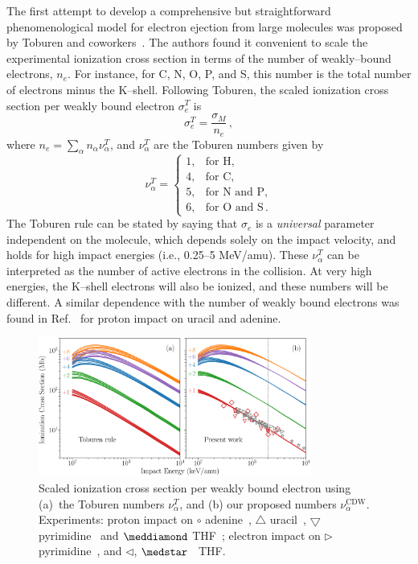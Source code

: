 \documentclass[10pt,showpacs,twocolumn]{revtex4}
\begin{document}
The first attempt to develop a comprehensive but straightforward 
phenomenological model for electron ejection from large molecules was 
proposed by Toburen and coworkers~\cite{toburen1975,toburen1976}. 
The authors found it convenient to scale the experimental ionization 
cross section in terms of the number of weakly--bound electrons, $n_e$.
For instance, for C, N, O, P, and S, this number is the total number of 
electrons minus the K--shell. Following Toburen, the scaled ionization 
cross section per weakly bound electron $\sigma_{e}^T$ is
\begin{equation}
\sigma_{e}^T=\frac{\sigma_{M}}{n_e}\,, 
\label{27} 
\end{equation}
where $n_e=\sum_{\alpha}n_{\alpha}\nu_{\alpha}^T$, and $\nu_{\alpha}^T$ 
are the Toburen numbers given by
\begin{equation}
\nu_{\alpha}^T=\left\{ 
\begin{array}{ll}
1, & \text{for H,} \\
4, & \text{for C,} \\ 
5, & \text{for N and P,} \\ 
6, & \text{for O and S}\,.
\end{array}\right.
\label{eq:nelec} 
\end{equation} 
The Toburen rule can be stated by saying that 
$\sigma_{e}$ is a \textit{universal} parameter independent on the 
molecule, which depends solely on the impact velocity, and holds for 
high impact energies (i.e., 0.25--5 MeV/amu).
These $\nu_{\alpha}^T$ can be interpreted as the number of active 
electrons in the collision. At very high energies, the K--shell 
electrons will also be ionized, and these numbers will be different.
A similar dependence with the number of weakly bound electrons was 
found in Ref.~\cite{itoh2013} for proton impact on uracil and adenine.

\begin{figure}[t!]
\centering
\includegraphics[width=0.8\textwidth]{figuras/molscaling85.eps}
\caption{Scaled ionization cross section per weakly bound electron using
(a)~the Toburen numbers $\nu_{\alpha}^T$, and (b) our proposed numbers
$\nu_{\alpha}^{\text{CDW}}$. Experiments: proton impact on 
\mbox{\Large$\circ$} adenine~\cite{iriki2011}, 
$\triangle$ uracil~\cite{itoh2013}, 
$\bigtriangledown$ pyrimidine~\cite{wolff2014} and $\meddiamond$ 
THF~\cite{wang2016}; electron impact on $\rhd$ pyrimidine~\cite{bug2017},
and $\lhd$, $\medstar$~\cite{wolf2019,fuss2009} THF.}
\label{fig:newscaling}
\end{figure}
\end{document}
